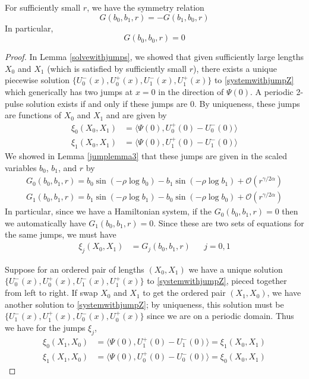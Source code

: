 \documentclass[thesis.tex]{subfiles}
\begin{document}
\begin{lemma}\label{Gsymm}
For sufficiently small $r$, we have the symmetry relation
\begin{equation}
G(b_0, b_1, r) = -G(b_1, b_0, r)
\end{equation}
In particular, 
\[
G(b_0, b_0, r) = 0
\]
\begin{proof}
In Lemma \ref{solvewithjumps}, we showed that given sufficiently large lengths $X_0$ and $X_1$ (which is satisfied by sufficiently small $r$), there exists a unique piecewise solution $\{ U_0^-(x), U_0^+(x), U_1^-(x), U_1^+(x) \}$ to \eqref{systemwithjumpZ} which generically has two jumps at $x = 0$ in the direction of $\Psi(0)$. A periodic 2-pulse solution exists if and only if these jumps are 0. By uniqueness, these jumps are functions of $X_0$ and $X_1$ and are given by
\begin{equation}\label{xijumps}
\begin{aligned}
\xi_0(X_0, X_1) &= \langle \Psi(0), U_0^+(0) - U_0^-(0) \rangle  \\
\xi_1(X_0, X_1) &= \langle \Psi(0), U_1^+(0) - U_1^-(0) \rangle 
\end{aligned}
\end{equation}
We showed in Lemma \ref{jumplemma3} that these jumps are given in the scaled variables $b_0$, $b_1$, and $r$ by
\begin{equation}\label{G0G1}
\begin{aligned}
G_0(b_0, b_1, r) = b_0 \sin \left( -\rho \log b_0 \right) - b_1 \sin \left( -\rho \log b_1 \right) + \mathcal{O}(r^{\gamma / 2 \alpha}) \\
G_1(b_0, b_1, r) = b_1 \sin \left( -\rho \log b_1 \right) - b_0 \sin \left( -\rho \log b_0 \right) + \mathcal{O}(r^{\gamma / 2 \alpha}) 
\end{aligned}
\end{equation}
In particular, since we have a Hamiltonian system, if the $G_0(b_0, b_1, r) = 0$ then we automatically have $G_1(b_0, b_1, r) = 0$. Since these are two sets of equations for the same jumps, we must have 
\begin{align}\label{xiGequiv}
\xi_j(X_0, X_1) &= G_j(b_0, b_1, r) && j = 0, 1
\end{align} 

Suppose for an ordered pair of lengths $(X_0, X_1)$ we have a unique solution $\{ U_0^-(x), U_0^+(x), U_1^-(x), U_1^+(x) \}$ to \eqref{systemwithjumpZ}, pieced together from left to right. If swap $X_0$ and $X_1$ to get the ordered pair $(X_1, X_0)$, we have another solution to \eqref{systemwithjumpZ}; by uniqueness, this solution must be $\{ U_1^-(x), U_1^+(x), U_0^-(x), U_0^+(x)\}$ since we are on a periodic domain. Thus we have for the jumps $\xi_j$,
\begin{equation}\label{xiswapX}
\begin{aligned}
\xi_0(X_1, X_0) &= \langle \Psi(0), U_1^+(0) - U_1^-(0) \rangle = \xi_1(X_0, X_1) \\
\xi_1(X_1, X_0) &= \langle \Psi(0), U_0^+(0) - U_0^-(0) \rangle = \xi_0(X_0, X_1)
\end{aligned}
\end{equation}


\end{proof}
\end{lemma}
\end{document}
